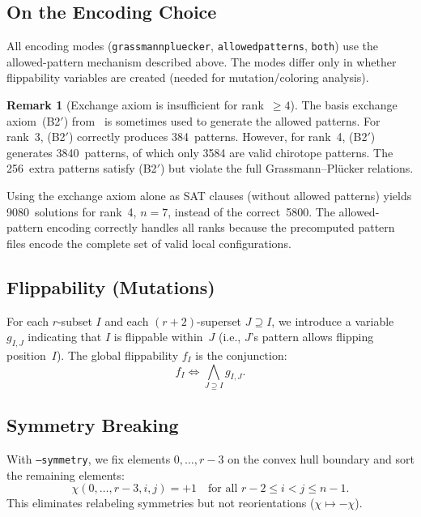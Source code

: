 \documentclass[11pt]{article}
\theoremstyle{definition}
\newtheorem{remark}{Remark}
\begin{document}
\subsection{On the Encoding Choice}
\label{sec:encoding-choice}

All encoding modes (\texttt{grassmannpluecker}, \texttt{allowedpatterns}, \texttt{both}) use the allowed-pattern mechanism described above.  The modes differ only in whether flippability variables are created (needed for mutation/coloring analysis).

\begin{remark}[Exchange axiom is insufficient for rank~$\geq 4$]
The basis exchange axiom~(B2$'$) from~\cite{BLSWZ1999} is sometimes used to generate the allowed patterns.  For rank~3, (B2$'$) correctly produces 384~patterns.  However, for rank~4, (B2$'$) generates 3840~patterns, of which only 3584 are valid chirotope patterns.  The 256~extra patterns satisfy (B2$'$) but violate the full Grassmann--Pl\"ucker relations.

Using the exchange axiom alone as SAT clauses (without allowed patterns) yields 9080~solutions for rank~4, $n=7$, instead of the correct~5800.  The allowed-pattern encoding correctly handles all ranks because the precomputed pattern files encode the complete set of valid local configurations.
\end{remark}

\subsection{Flippability (Mutations)}

For each $r$-subset $I$ and each $(r{+}2)$-superset $J \supseteq I$, we introduce a variable $g_{I,J}$ indicating that $I$ is flippable within~$J$ (i.e., $J$'s pattern allows flipping position~$I$). The global flippability $f_I$ is the conjunction:
\[
  f_I \Leftrightarrow \bigwedge_{J \supseteq I} g_{I,J}.
\]

\subsection{Symmetry Breaking}

With \texttt{--symmetry}, we fix elements $0, \ldots, r{-}3$ on the convex hull boundary and sort the remaining elements:
\[
  \chi(0, \ldots, r{-}3, i, j) = +1 \quad \text{for all } r{-}2 \leq i < j \leq n{-}1.
\]
This eliminates relabeling symmetries but not reorientations ($\chi \mapsto -\chi$).
\end{document}
